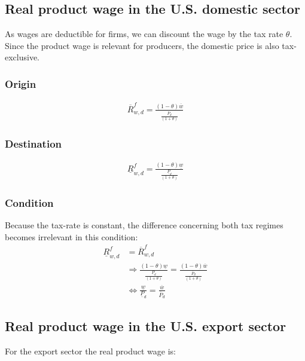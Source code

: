 \subsection*{Real product wage in the U.S. domestic sector}
As wages are deductible for firms, we can discount the wage by the tax rate $\theta$. Since the product wage is relevant for producers, the domestic price is also tax-exclusive.
\subsubsection*{Origin}
\begin{equation}\label{prodw.o}
\begin{aligned}
\overline R^f_{w, d} = \frac{ \left( 1-\theta \right) \overline w}{\frac{\overline P_d}{ \left( 1+\theta \right) }}\end{aligned}  \end{equation}

\subsubsection*{Destination}
\begin{equation}\label{prodw.d}
\begin{aligned}
\underline R^f_{w, d} = \frac{ \left( 1-\theta \right) \underline w}{\frac{\underline P_d}{ \left( 1+\theta \right) }}\end{aligned}  \end{equation}

\subsubsection*{Condition}
Because the tax-rate is constant, the difference concerning both tax regimes becomes  irrelevant in this condition:
\begin{equation}\label{prodw.con}
\begin{aligned}
    \underline R^f_{w, d} &= \overline R^f_{w, d} \\ &\Rightarrow \frac{ \left( 1-\theta \right) \underline w}{\frac{\underline P_d}{ \left( 1+\theta \right) }} = \frac{ \left( 1-\theta \right) \overline w}{\frac{\overline P_d}{ \left( 1+\theta \right) }} \\ &\Leftrightarrow \frac{\underline w}{\underline P_d} = \frac{\overline w}{\overline P_d} 
\end{aligned}  \end{equation}

\subsection*{Real product wage in the U.S. export sector}
For the export sector the real product wage is:
